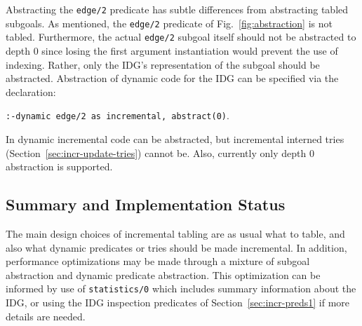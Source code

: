 Abstracting the {\tt edge/2} predicate has subtle differences from
abstracting tabled subgoals.
As mentioned, the {\tt edge/2} predicate of
Fig.~\ref{fig:abstraction} is not tabled.  Furthermore, the actual
{\tt edge/2} subgoal itself should not be abstracted to depth 0 since
losing the first argument instantiation would prevent the use of
indexing.  Rather, only the IDG's representation of the subgoal
should be abstracted.  Abstraction of dynamic code for
the IDG can be specified via the declaration:
\begin{center}
{\tt :-dynamic edge/2 as incremental, abstract(0)}.
\end{center}

In \version{} dynamic incremental code can be abstracted, but
incremental interned tries (Section~\ref{sec:incr-update-tries})
cannot be.  Also, currently only depth 0 abstraction is supported.

\subsection{Summary and Implementation Status}
%

The main design choices of incremental tabling
are as usual what to table, and also what dynamic predicates or tries
should be made incremental.  In addition, performance optimizations
may be made through a mixture of subgoal abstraction and dynamic
predicate abstraction.  This optimization can be informed by use of
{\tt statistics/0} which includes summary information about the IDG,
or using the IDG inspection predicates of
Section~\ref{sec:incr-preds1} if more details are needed.


